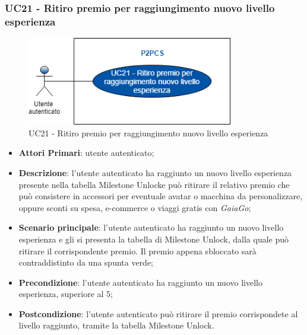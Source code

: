 \subsubsection{UC21 - Ritiro premio per raggiungimento nuovo livello esperienza}
\begin{figure}[h]
	\includegraphics[width=9cm]{res/images/uc19.png}
	\centering
	\caption{UC21 - Ritiro premio per raggiungimento nuovo livello esperienza}
\end{figure}
\begin{itemize}
	\item \textbf{Attori Primari}: utente autenticato;
	\item \textbf{Descrizione}: l'utente autenticato ha raggiunto un nuovo livello esperienza presente nella tabella Milestone Unlock\glosp e può ritirare il relativo premio che può consistere in accessori per eventuale avatar o macchina da personalizzare, oppure sconti su spesa, e-commerce o viaggi gratis con \textit{GaiaGo};	
	\item \textbf{Scenario principale}: l'utente autenticato ha raggiunto un nuovo livello esperienza e gli si presenta la tabella di Milestone Unlock, dalla quale può ritirare il corrispondente premio. Il premio appena sbloccato sarà contraddistinto da una spunta verde;
	\item \textbf{Precondizione}: l'utente autenticato ha raggiunto un nuovo livello esperienza, superiore al 5;
	\item \textbf{Postcondizione}: l'utente autenticato può ritirare il premio corrispondete al livello raggiunto, tramite la tabella Milestone Unlock.
\end{itemize}
